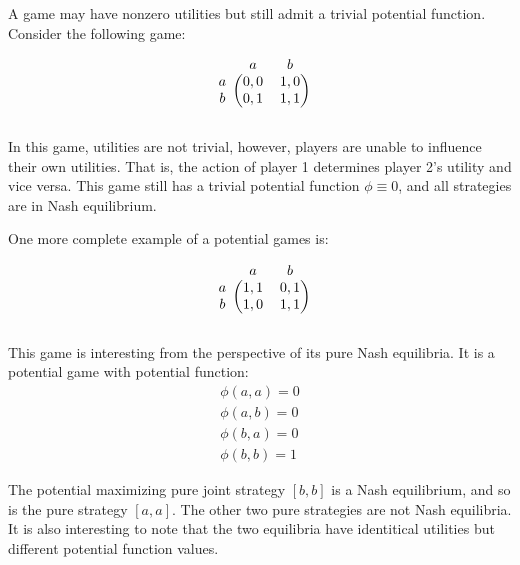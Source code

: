 A game may have nonzero utilities but still admit a trivial potential function. Consider the following game:

\begin{equation}

   \begin{blockarray}{ccc}
 & a & b \\
\begin{block}{c(cc)}
  a & 0,0 & 1,0  \\
  b & 0,1  & 1,1  \\
\end{block}
\end{blockarray} 

\label{eq:helpergame}
\end{equation}

In this game, utilities are not trivial, however, players are unable to influence their own utilities. That is, the action of player 1 determines player 2's utility and vice versa. This game still has a trivial potential function $\phi \equiv 0$, and all strategies are in Nash equilibrium.

One more complete example of a potential games is:

\begin{equation}

   \begin{blockarray}{ccc}
 & a & b \\
\begin{block}{c(cc)}
  a & 1,1 & 0,1  \\
  b & 1,0  & 1,1  \\
\end{block}
\end{blockarray} 

\label{eq:PoA}
\end{equation}

This game is interesting from the perspective of its pure Nash equilibria. It is a potential game with potential function:
\begin{align*}
\phi(a,a) = 0 \\
\phi(a,b) = 0 \\
\phi(b,a) = 0 \\
\phi(b,b) = 1
\end{align*}

The potential maximizing pure joint strategy $\left[b,b\right]$ is a Nash equilibrium, and so is the pure strategy $\left[a,a\right]$. The other two pure strategies are not Nash equilibria. It is also interesting to note that the two equilibria have identitical utilities but different potential function values. 


